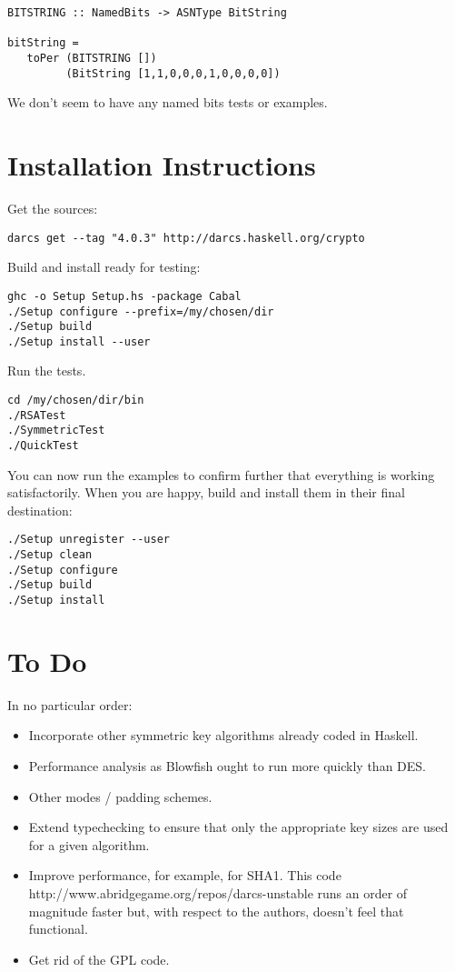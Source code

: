 \documentclass{article}
\begin{document}
\begin{lstlisting}[frame=single]
BITSTRING :: NamedBits -> ASNType BitString

bitString = 
   toPer (BITSTRING []) 
         (BitString [1,1,0,0,0,1,0,0,0,0])
\end{lstlisting}

We don't seem to have any named bits tests or examples.

\section{Installation Instructions}

Get the sources:

\lstset{language=shell,basicstyle=\ttfamily\small}
\begin{lstlisting}[frame=single]
darcs get --tag "4.0.3" http://darcs.haskell.org/crypto
\end{lstlisting}

Build and install ready for testing:

\begin{lstlisting}[frame=single]
ghc -o Setup Setup.hs -package Cabal
./Setup configure --prefix=/my/chosen/dir
./Setup build
./Setup install --user
\end{lstlisting}

Run the tests.

\begin{lstlisting}[frame=single]
cd /my/chosen/dir/bin
./RSATest
./SymmetricTest
./QuickTest
\end{lstlisting}

You can now run the examples to confirm further that everything
is working satisfactorily.
When you are happy, build and install them in
their final destination:

\begin{lstlisting}[frame=single]
./Setup unregister --user
./Setup clean
./Setup configure
./Setup build
./Setup install
\end{lstlisting}

\section{To Do}

In no particular order:

\begin{itemize}
\item
Incorporate other symmetric key algorithms already coded in Haskell.
\item
Performance analysis as Blowfish ought to run more quickly than DES.
\item
Other modes / padding schemes.
\item
Extend typechecking to ensure that only the appropriate key sizes are used
for a given algorithm.
\item
Improve performance, for example, for SHA1. This 
\htmladdnormallinkfoot
{code}
{http://www.abridgegame.org/repos/darcs-unstable}
runs an order of magnitude faster but, with respect to the authors, doesn't
feel that functional.
\item
Get rid of the GPL code.
\end{itemize}
\end{document}

